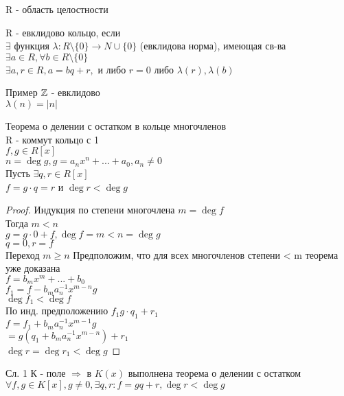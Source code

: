 R - область целостности \\
\begin{definition}
	R - евклидово кольцо, если \\
	$ \exists $ функция $ \lambda : R \setminus \{0\} \rightarrow N \cup \{0\} $ (евклидова норма), имеющая св-ва \\
	$ \exists a \in R, \forall b \in R \setminus \{0\} $ \\
	$ \exists a, r \in R, a = bq + r, $ и либо $ r = 0$ либо $ \lambda(r) , \lambda(b) $
\end{definition}
Пример $ \mathbb{Z} $ - евклидово \\
$ \lambda(n) = |n| $ \\
\begin{theorem}
	Теорема о делении с остатком в кольце многочленов \\
	R - коммут кольцо с 1 \\
	$ f, g \in R[x] $ \\
	$ n = \deg g, g = a_nx^n + ... + a_0, a_n \neq 0 $ \\
	Пусть $ \exists q, r \in R[x] $ \\
	$ f = g \cdot q = r $ и $ \deg r < \deg g $ \\
	\begin{proof}
		Индукция по степени многочлена $ m = \deg f $ \\
		Тогда $ m < n $ \\
		$ g = g \cdot 0 + f, \deg f = m < n = \deg g  $\\
		$ q = 0, r = f $ \\
		Переход $ m \geq n $ Предположим, что для всех многочленов степени < m теорема уже доказана  \\
		$ f = b_mx^m+ ... + b_0 $ \\
		$ f_1 = f - b_ma_n^{-1}x^{m-n}g $ \\
		$ \deg f_1 < \deg f $ \\
		По инд. предположению $ f_1 g \cdot q_1 + r_1 $ \\
		$ f = f_1 + b_ma_n^{-1} x ^{m-1}g $ \\
		$ = g(q_1 + b _ma_n^{-1} x^{m-n}) + r_1 $\\
		$ \deg r = \deg r_1 < \deg g $ 
	\end{proof}
\end{theorem}
Сл. 1 К - поле $ \Rightarrow $ в $ K(x) $ выполнена теорема о делении с остатком \\
$ \forall f,g \in K[x], g \neq 0, \exists q, r : f = gq+r, \deg r < \deg g $\\

